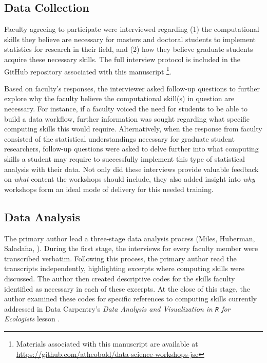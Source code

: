 \documentclass[12pt]{article}
\begin{document}
\subsection{Data Collection}  

\quad Faculty agreeing to participate were interviewed regarding (1) the 
computational skills they believe are necessary for masters and doctoral 
students to implement statistics for research in their field, and (2) how they 
believe graduate students acquire these necessary skills. The full interview 
protocol is included in the GitHub repository associated with this manuscript 
\footnote{Materials associated with this manuscript are available at 
\href{https://github.com/atheobold/data-science-workshops-jse}{https://github.com/atheobold/data-science-workshops-jse}}.  

\quad Based on faculty's responses, the interviewer asked follow-up questions to
further explore why the faculty believe the computational skill(s) in question 
are necessary. For instance, if a faculty voiced the need for students to be 
able to build a data workflow, further information was sought regarding what 
specific computing skills this would require. Alternatively, when the response 
from faculty consisted of the statistical understandings necessary for graduate
student researchers, follow-up questions were asked to delve further into what
computing skills a student may require to successfully implement this type of
statistical analysis with their data. Not only did these interviews provide
valuable feedback on \emph{what} content the workshops should include, they also
added insight into \emph{why} workshops form an ideal mode of delivery for this
needed training.  

\subsection{Data Analysis} 

\quad The primary author lead a three-stage data analysis process (Miles, 
Huberman, Salada$\tilde{\text{n}}$a, \citeyear{miles}). During the first stage,
the interviews for every faculty member were transcribed verbatim. Following 
this process, the primary author read the transcripts independently, 
highlighting excerpts where computing skills were discussed. The author then 
created descriptive codes for the skills faculty identified as necessary in each
of these excerpts. At the close of this stage, the author examined these codes 
for specific references to computing skills currently addressed in Data 
Carpentry's \emph{Data Analysis and Visualization in \texttt{R} for Ecologists} 
lesson \citep{ecology_curriculum}. 
\end{document}
